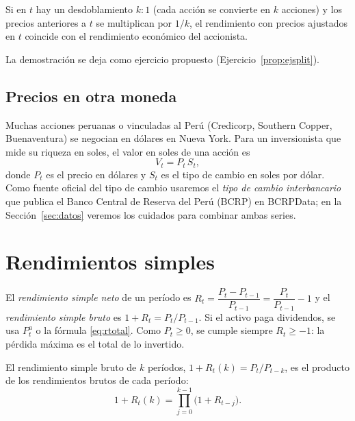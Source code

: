 \begin{proposicion}[Desdoblamientos]\label{prop:split}
Si en $t$ hay un desdoblamiento $k\!:\!1$ (cada acción se convierte en $k$ acciones) y los precios
anteriores a $t$ se multiplican por $1/k$, el rendimiento con precios ajustados en $t$ coincide con el
rendimiento económico del accionista.
\end{proposicion}
La demostración se deja como ejercicio propuesto (Ejercicio~\ref{prop:ejsplit}).

\subsection{Precios en otra moneda}

Muchas acciones peruanas o vinculadas al Perú (Credicorp, Southern Copper, Buenaventura) se negocian en
dólares en Nueva York. Para un inversionista que mide su riqueza en soles, el valor en soles de una
acción es
\[
  V_t=P_t\,S_t,
\]
donde $P_t$ es el precio en dólares y $S_t$ es el tipo de cambio en soles por dólar. Como fuente
oficial del tipo de cambio usaremos el \emph{tipo de cambio interbancario} que publica el Banco Central
de Reserva del Perú (BCRP) en BCRPData; en la Sección~\ref{sec:datos} veremos los cuidados para combinar
ambas series.

\section{Rendimientos simples}

\begin{definicion}
El \emph{rendimiento simple neto} de un período es $R_t=\dfrac{P_t-P_{t-1}}{P_{t-1}}=\dfrac{P_t}{P_{t-1}}-1$
y el \emph{rendimiento simple bruto} es $1+R_t=P_t/P_{t-1}$. Si el activo paga dividendos, se usa
$P_t^{a}$ o la fórmula \eqref{eq:rtotal}. Como $P_t\ge 0$, se cumple siempre $R_t\ge -1$: la pérdida
máxima es el total de lo invertido.
\end{definicion}

\begin{proposicion}\label{prop:multi}
El rendimiento simple bruto de $k$ períodos, $1+R_t(k)=P_t/P_{t-k}$, es el producto de los rendimientos
brutos de cada período:
\[
  1+R_t(k)=\prod_{j=0}^{k-1}\bigl(1+R_{t-j}\bigr).
\]
\end{proposicion}

